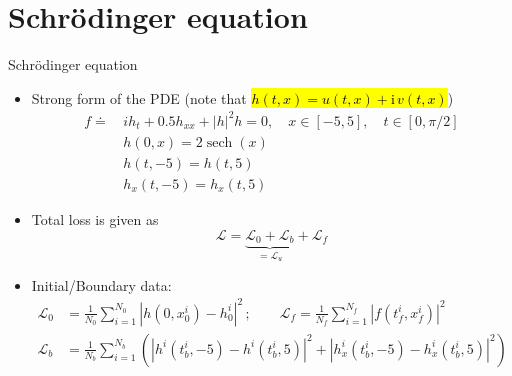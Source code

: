 \documentclass[xcolor=dvipsnames,10pt]{beamer}
\makeatletter
\let\HL\hl
\renewcommand\hl{%
  \let\set@color\beamerorig@set@color
  \let\reset@color\beamerorig@reset@color
  \HL}
\makeatother
\begin{document}
\section{Schr\"{o}dinger equation}
\begin{frame}[t]{Schr\"{o}dinger equation}
    \begin{itemize}
      \item<1-> Strong form of the PDE (note that \hl{$h(t, x) = u(t, x) + \mathrm{i}\, v(t,x)$})
      $$
      \begin{aligned}
        f\doteq \, &i h_{t}+0.5 h_{x x}+|h|^{2} h=0, \quad x \in[-5,5], \quad t \in[0, \pi / 2] \\
        &h(0, x)=2 \operatorname{sech}(x) \\
        &h(t,-5)=h(t, 5) \\
        &h_{x}(t,-5)=h_{x}(t, 5)
      \end{aligned}
    $$
    \item<2-> Total loss is given as
    $$
      \mathcal{L}
      =
      \underbrace{\mathcal{L}_{0}+\mathcal{L}_{b}}_{=\mathcal{L}_u}
      +
      \mathcal{L}_{f}
    $$
    \item<3-> Initial/Boundary data: 
    $$
      \begin{aligned}
        \mathcal{L}_{0}
      & =
      \frac{1}{N_{0}} \sum_{i=1}^{N_{0}}\left|h\left(0, x_{0}^{i}\right)-h_{0}^{i}\right|^{2}\, ;
      \qquad \mathcal{L}_{f}=\frac{1}{N_{f}} \sum_{i=1}^{N_{f}}\left|f\left(t_{f}^{i}, x_{f}^{i}\right)\right|^{2}
      \\
      \mathcal{L}_{b}
      & =
      \frac{1}{N_{b}} \sum_{i=1}^{N_{b}}\left(\left|h^{i}\left(t_{b}^{i},-5\right)-h^{i}\left(t_{b}^{i}, 5\right)\right|^{2}+\left|h_{x}^{i}\left(t_{b}^{i},-5\right)-h_{x}^{i}\left(t_{b}^{i}, 5\right)\right|^{2}\right)
      \end{aligned}
    $$
  \end{itemize}
\end{frame}
\end{document}
